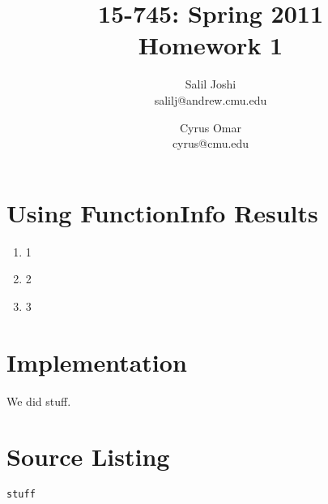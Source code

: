 \documentclass[12pt]{article}
\title{{\small 15-745: Spring 2011}\\Homework 1}
\author{Salil Joshi\\
salilj@andrew.cmu.edu
\and
Cyrus Omar\\
cyrus@cmu.edu
}
\date{}                                           %
\begin{document}
\maketitle
\section{Using FunctionInfo Results}
\begin{enumerate}
\item 1
\item 2
\item 3
\end{enumerate}
\section{Implementation}
We did stuff.
\section{Source Listing}
\begin{verbatim}
stuff
\end{verbatim}
\end{document}

